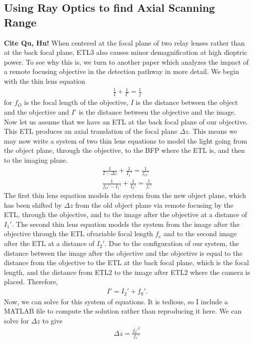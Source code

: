 \subsection{Using Ray Optics to find Axial Scanning Range}
\textbf{Cite Qu, Hu!} When centered at the focal plane of two relay lenses rather than at the back focal plane, ETL3 also causes minor demagnification at high dioptric power. To see why this is, we turn to another paper which analyzes the impact of a remote focusing objective in the detection pathway in more detail. We begin with the thin lens equation
\begin{gather}
	\frac{1}{I} + \frac{1}{I'} = \frac 1 f
\end{gather}
for $f_O$ is the focal length of the objective, $I$ is the distance between the object and the objective and $I'$ is the distance between the objective and the image. Now let us assume that we have an ETL at the back focal plane of our objective. This ETL produces an axial translation of the focal plane $\Delta z$. This means we may now write a system of two thin lens equations to model the light going from the object plane, through the objective, to the BFP where the ETL is, and then to the imaging plane.
\begin{gather}
	\frac{1}{I-\Delta z} + \frac{1}{I_1'}  = \frac 1{f_O'}\\
	\frac{1}{f_O' -I_1'}+\frac{1}{I_2'} = \frac{1}{f_e'}
\end{gather}
The first thin lens equation models the system from the new object plane, which has been shifted by $\Delta z$ from the old object plane via remote focusing by the ETL, through the objective, and to the image after the objective at a distance of $I_1'$. The second thin lens equation models the system from the image after the objective through the ETL ofvariable focal length $f_e$ and to the second image after the ETL at a distance of $I_2'$. Due to the configuration of our system, the distance between the image after the objective and the objective is equal to the distance from the objective to the ETL at the back focal plane, which is the focal length, and the distance from ETL2 to the image after ETL2 where the camera is placed. Therefore,
\begin{gather}
	I' = I_2' + f_0'.
\end{gather}
Now, we can solve for this system of equations. It is tedious, so I include a MATLAB file to compute the solution rather than reproducing it here. We can solve for $\Delta z$ to give
\begin{gather}
	\Delta z = \frac{f_0'^2}{f_e'}
\end{gather}
